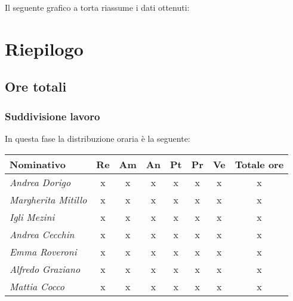 {{{{{{{{{{Il seguente grafico a torta riassume i dati ottenuti:

\section{Riepilogo}\label{5.6}

\subsection{Ore totali}\label{5.6.1}

\subsubsection{Suddivisione lavoro}\label{5.6.1.1}
In questa fase la distribuzione oraria è la seguente:
\quad
\def\tabularxcolumn#1{m{#1}}
{
	
	\begin{center}
		\renewcommand{\arraystretch}{1.4}
		\begin{tabularx}{\textwidth}{|X|c|c|c|c|c|c|c|}
			\hline
			\rowcolor{airforceblue}
			\textbf{Nominativo} & \textbf{Re} & \textbf{Am} & \textbf{An} & \textbf{Pt} & \textbf{Pr} & \textbf{Ve} & \textbf{Totale ore}\\
			\hline
			\textit{Andrea Dorigo} & x & x & x & x & x & x & x\\
			\hline
			\textit{Margherita Mitillo} & x & x & x & x & x & x & x\\
			\hline
			\textit{Igli Mezini} & x & x & x & x & x & x & x\\
			\hline
			\textit{Andrea Cecchin} & x & x & x & x & x & x & x\\
			\hline
			\textit{Emma Roveroni} & x & x & x & x & x & x & x\\
			\hline
			\textit{Alfredo Graziano} & x & x & x & x & x & x & x\\
			\hline
			\textit{Mattia Cocco} & x & x & x & x & x & x & x\\
			\hline
		\end{tabularx}
	\end{center}

}}}}}}}}}}}

